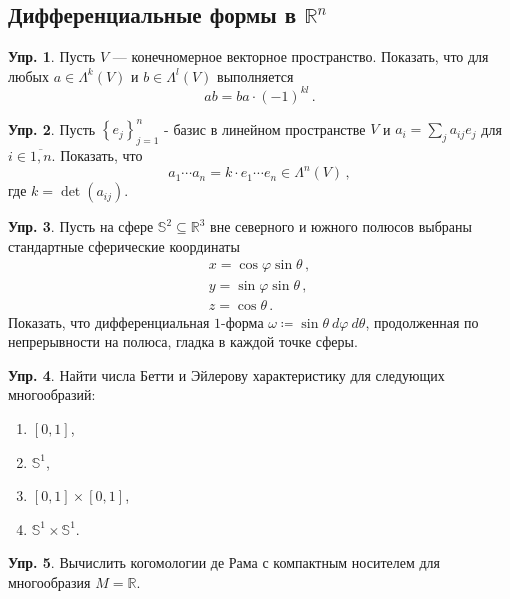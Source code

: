 \documentclass[a4paper, 12pt]{article}
\theoremstyle{definition}
\newtheorem{exercise}{Упр.}
\begin{document}
\subsection{Дифференциальные формы в \({ \mathbb R^{n} }\)}

\begin{exercise}
    Пусть \({ V }\) --- конечномерное векторное пространство. Показать, что для любых \({ a \in \Lambda^{k}(V) }\) и \({ b \in \Lambda^{l}(V) }\) выполняется \[
        ab = ba \cdot (-1)^{kl}\,.
    \]
\end{exercise}

\begin{exercise}
    Пусть \({ \left\{ e_{j} \right\}_{j = 1}^{n} }\) - базис в линейном пространстве \({ V }\) и \({ a_i = \sum_j a_{ij} e_{j} }\) для \({ i \in \overline{1, n} }\). Показать, что \[
        a_1 \cdots a_n = k \cdot e_{1} \cdots e_n \in \Lambda^{n}(V)\,,
    \] где \({ k = \det (a_{ij}) }\).
\end{exercise}

\begin{exercise}
    Пусть на сфере \({ \mathbb S^2 \subseteq \mathbb R^3 }\) вне северного и южного полюсов выбраны стандартные сферические координаты \[
        \begin{gathered}
            x = \cos \varphi \sin \theta\,, \\
            y = \sin \varphi \sin \theta\,, \\
            z = \cos \theta\,.
        \end{gathered}
    \] Показать, что дифференциальная \({ 1 }\)-форма \({ \omega \coloneqq \sin \theta\: d\varphi\: d\theta }\), продолженная по непрерывности на полюса, гладка в каждой точке сферы.
\end{exercise}

\begin{exercise}
    Найти числа Бетти и Эйлерову характеристику для следующих многообразий:
    \begin{enumerate}
        \item \({ [0, 1] }\),
        \item \({ \mathbb S^1 }\),
        \item \({ [0, 1] \times [0, 1] }\),
        \item \({ \mathbb S^1 \times \mathbb S^1 }\).
    \end{enumerate}
\end{exercise}

\begin{exercise}
    Вычислить когомологии де Рама с компактным носителем для многообразия \({ M = \mathbb R }\).
\end{exercise}
\end{document}
